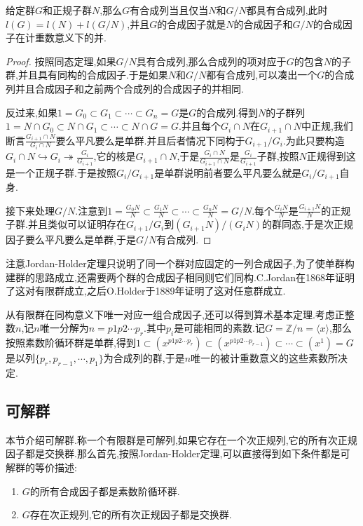 给定群$G$和正规子群$N$,那么$G$有合成列当且仅当$N$和$G/N$都具有合成列,此时$l(G)=l(N)+l(G/N)$,并且$G$的合成因子就是$N$的合成因子和$G/N$的合成因子在计重数意义下的并.
\begin{proof}
	
	按照同态定理,如果$G/N$具有合成列,那么合成列的项对应于$G$的包含$N$的子群,并且具有同构的合成因子.于是如果$N$和$G/N$都有合成列,可以凑出一个$G$的合成列并且合成因子和之前两个合成列的合成因子的并相同.
	
	反过来,如果$1=G_0\subset G_1\subset\cdots\subset G_n=G$是$G$的合成列.得到$N$的子群列$1=N\cap G_0\subset N\cap G_1\subset\cdots\subset N\cap G=G$.并且每个$G_i\cap N$在$G_{i+1}\cap N$中正规,我们断言$\frac{G_{i+1}\cap N}{G_i\cap N}$要么平凡要么是单群.并且后者情况下同构于$G_{i+1}/G_i$.为此只要构造$G_i\cap N\hookrightarrow G_i\twoheadrightarrow\frac{G_i}{G_{i+1}}$,它的核是$G_{i+1}\cap N$,于是$\frac{G_i\cap N}{G_{i+1}\cap N}$是$\frac{G_i}{G_{i+1}}$子群,按照$N$正规得到这是一个正规子群.于是按照$G_i/G_{i+1}$是单群说明前者要么平凡要么就是$G_i/G_{i+1}$自身.
	
	接下来处理$G/N$.注意到$1=\frac{G_0N} {N}\subset\frac{G_1N}{N}\subset\cdots\subset\frac{G_nN}{N}=G/N$.每个$\frac{G_iN}{N}$是$\frac{G_{i+1}N}{N}$的正规子群.并且类似可以证明存在$G_{i+1}/G_i$到$(G_{i+1}N)/(G_iN)$的群同态,于是次正规因子要么平凡要么是单群,于是$G/N$有合成列.
\end{proof}

注意Jordan-Holder定理只说明了同一个群对应固定的一列合成因子,为了使单群构建群的思路成立,还需要两个群的合成因子相同则它们同构.C.Jordan在1868年证明了这对有限群成立,之后O.Holder于1889年证明了这对任意群成立.

从有限群在同构意义下唯一对应一组合成因子,还可以得到算术基本定理.考虑正整数$n$,记$n$唯一分解为$n=p1p2\cdots p_r$.其中$p_i$是可能相同的素数.记$G=\mathbb{Z}/n=\langle x\rangle$,那么按照素数阶循环群是单群,得到$1\subset(x^{p1p2\cdots p_r})\subset(x^{p1p2\cdots p_{r-1}})\subset\cdots\subset(x^1)=G$是以列$\{p_r,p_{r-1},\cdots,p_1\}$为合成列的群,于是$n$唯一的被计重数意义的这些素数所决定.
\newpage
\subsection{可解群}

本节介绍可解群.称一个有限群是可解列,如果它存在一个次正规列,它的所有次正规因子都是交换群.那么首先,按照Jordan-Holder定理,可以直接得到如下条件都是可解群的等价描述:
\begin{enumerate}
	\item $G$的所有合成因子都是素数阶循环群.
	\item $G$存在次正规列,它的所有次正规因子都是交换群.
\end{enumerate}


